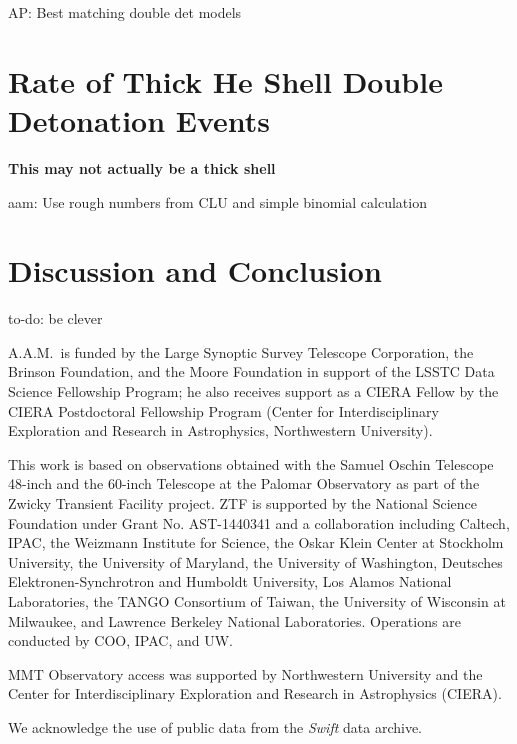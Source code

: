 \documentclass[twocolumn]{aastex63}
\newcommand{\abi}[1]{{\color{LincolnGreen} AP: {#1}}}
\newcommand{\aam}[1]{{\color{DarkOrange} aam: {#1}}}
\newcommand{\todo}[1]{{\color{magenta} to-do: {#1}}}
\begin{document}
\abi{Best matching double det models}


\section{Rate of Thick He Shell Double Detonation Events}\label{sec:rates}

\textbf{This may not actually be a thick shell}

\aam{Use rough numbers from CLU and simple binomial calculation}

\section{Discussion and Conclusion}\label{sec:conclusions}

\todo{be clever}

\acknowledgements

A.A.M.~is funded by the Large Synoptic Survey Telescope Corporation, the
Brinson Foundation, and the Moore Foundation in support of the LSSTC Data
Science Fellowship Program; he also receives support as a CIERA Fellow by the
CIERA Postdoctoral Fellowship Program (Center for Interdisciplinary
Exploration and Research in Astrophysics, Northwestern University).

This work is based on observations obtained with the Samuel Oschin Telescope
48-inch and the 60-inch Telescope at the Palomar Observatory as part of the
Zwicky Transient Facility project. ZTF is supported by the National Science
Foundation under Grant No. AST-1440341 and a collaboration including Caltech,
IPAC, the Weizmann Institute for Science, the Oskar Klein Center at Stockholm
University, the University of Maryland, the University of Washington,
Deutsches Elektronen-Synchrotron and Humboldt University, Los Alamos National
Laboratories, the TANGO Consortium of Taiwan, the University of Wisconsin at
Milwaukee, and Lawrence Berkeley National Laboratories. Operations are
conducted by COO, IPAC, and UW.

MMT Observatory access was supported by Northwestern University and the
Center for Interdisciplinary Exploration and Research in Astrophysics (CIERA).

We acknowledge the use of public data from the \textit{Swift} data archive.

\end{document}
